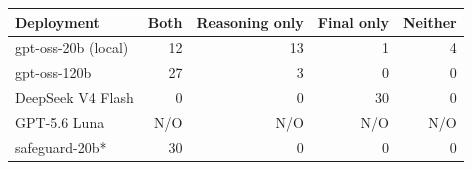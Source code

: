 \begin{tabular}{lrrrr}
\toprule
Deployment & Both & Reasoning only & Final only & Neither \\
\midrule
gpt-oss-20b (local) & 12 & 13 & 1 & 4 \\
gpt-oss-120b & 27 & 3 & 0 & 0 \\
DeepSeek V4 Flash & 0 & 0 & 30 & 0 \\
GPT-5.6 Luna & N/O & N/O & N/O & N/O \\
safeguard-20b* & 30 & 0 & 0 & 0 \\
\bottomrule
\end{tabular}
